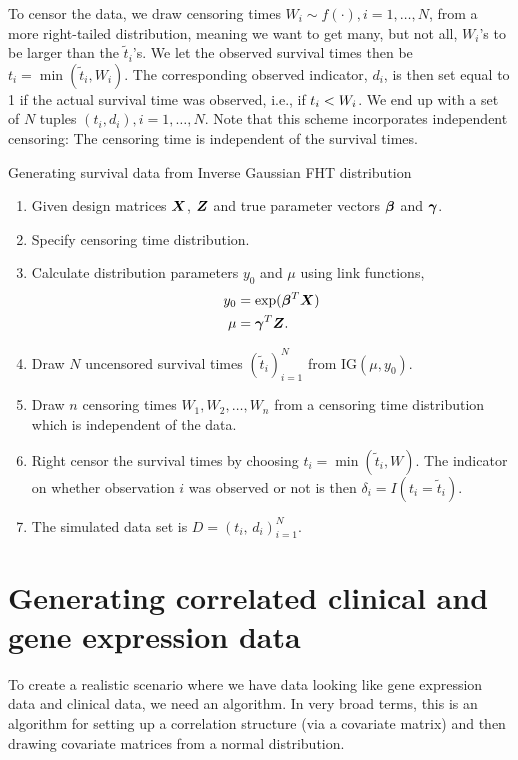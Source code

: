 To censor the data, we draw censoring times $W_i\sim f(\cdot),i=1,\ldots,N$, from a more right-tailed distribution, meaning we want to get many, but not all, $W_i$'s to be larger than the $\tilde{t}_i$'s. We let the observed survival times then be $t_i=\min(\tilde{t}_i,W_i)$.
The corresponding observed indicator, $d_i$, is then set equal to 1 if the actual survival time was observed, i.e., if $t_{i}<W_i$. We end up with a set of $N$ tuples $(t_i,d_i),i=1,\ldots,N$. Note that this scheme incorporates independent censoring: The censoring time is independent of the survival times.

\begin{algorithm}
\caption{Generating survival data from Inverse Gaussian FHT distribution}
\label{algo:FHT-sim}
\begin{enumerate}
    \item Given design matrices $\bm{X}$, $\bm{Z}$ and true parameter vectors $\boldsymbol{\beta}$ and $\boldsymbol{\gamma}$.
    \item Specify censoring time distribution.
    \item Calculate distribution parameters $y_0$ and $\mu$ using link functions,
        \begin{align*}
            y_0&=\exp(\boldsymbol{\beta}^T\bm{X}) \\
            \mu&=\boldsymbol{\gamma}^T\bm{Z}.
        \end{align*}
    \item Draw $N$ uncensored survival times $(\tilde{t}_i)_{i=1}^N$ from IG$(\mu,y_0)$.
    \item Draw $n$ censoring times $W_1,W_2,\ldots,W_n$ from a censoring time distribution which is independent of the data.
    \item Right censor the survival times by choosing $t_i=\min(\tilde{t}_i,W)$.
        The indicator on whether observation $i$ was observed or not is then $\delta_i=I(t_i=\tilde{t}_i)$.
    \item The simulated data set is $D=(t_i,\,d_i)_{i=1}^N$.
\end{enumerate}
\end{algorithm}

\section{Generating correlated clinical and gene expression data}
To create a realistic scenario where we have data looking like gene expression data and clinical data, we need an algorithm.
In very broad terms, this is an algorithm for setting up a correlation structure (via a covariate matrix) and then drawing covariate matrices from a
normal distribution.

